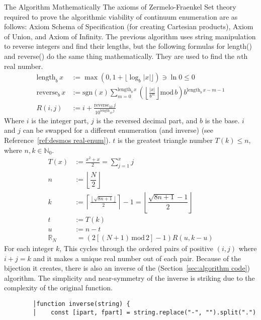 \documentclass[12pt]{article}
\begin{document}
\begin{section}{The Algorithm Mathematically}\label{sec:algorithm mathematically}
	The axioms of Zermelo-Fraenkel Set theory required to prove the algorithmic viability of
	continuum enumeration are as follows: Axiom Schema of Specification (for creating Cartesian
	products), Axiom of Union, and Axiom of Infinity. The previous algorithm uses string
	manipulation to reverse integers and find their lengths, but the following formulas for length()
	and reverse() do the same thing mathematically. They are used to find the $n$th real number.\\
	\begin{align}
		\text{length}_b\,x & := \max\!\left(0,1+\lfloor\log_b|x|\rfloor\right)\ni\ln0\leqslant0\\
		\text{reverse}_b\,x & :=\text{sgn}(x)\!\!\sum_{m=0}^{\text{length}_b\,x}\left(\left\lfloor
		\frac{|x|}{b^m}\right\rfloor\text{mod}\,b\right)\!b^{\text{length}_b\,x-m-1}\\
		R(i,j) & := i+\frac{\text{reverse}_{10}\,j}{10^{\text{length}_{10}\,j}}
	\end{align}
	Where $i$ is the integer part, $j$ is the reversed decimal part, and $b$ is the base. $i$ and $j$
	can be swapped for a different enumeration (and inverse) (see Reference~\ref{ref:desmos real-enum}).
	$t$ is the greatest triangle number $T(k)\leqslant n$, where $n,k\in\mathbb N_0$.\\
	\begin{align}
		T(x) &:= \frac{x^2+x}2 = \sum_{j=1}^xj\\
		n &:= \left\lfloor\dfrac N2\right\rfloor\\
		k &:= \left\lceil\frac{\left\lfloor\sqrt{8n+1}\right\rfloor}2\right\rceil-1 =
		\left\lfloor\dfrac{\sqrt{8n+1}-1}2\right\rfloor\\
		t &:= T(k)\\
		u &:= n - t\\
		\mathbb R_N&\,\, = (2[(N+1)\,\text{mod}\,2]-1)R(u, k-u)
	\end{align}
	For each integer $k$, This cycles through the ordered pairs of positive $(i, j)$ where $i + j = k$
	and it makes a unique real number out of each pair. Because of the bijection it creates, there is
	also an inverse of the (Section~\ref{sec:algorithm code}) algorithm. The simplicity and
	near-symmetry of the inverse is striking due to the complexity of the original function.
	\begin{verbatim}
		│function inverse(string) {
		│    const [ipart, fpart] = string.replace("-", "").split(".")

\end{verbatim}
\end{section}
\end{document}
